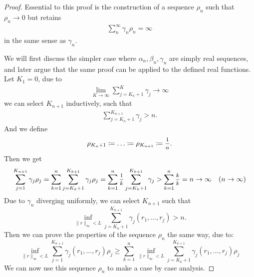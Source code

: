 \begin{proof}
    Essential to this proof is the construction of a sequence \(\rho_n\) such that \(\rho_n\to 0\) but retains
    \begin{align}\label{gamma tilde retains}
        \sum_n^\infty \gamma_n \rho_n =\infty
    \end{align}
    in the same sense as \(\gamma_n\).

    We will first discuss the simpler case where \(\alpha_n, \beta_n,\gamma_n\) are simply real sequences, and later argue that the same proof can be applied to the defined real functions. Let \(K_1=0\), due to
    \begin{align}
        \lim_{K\to\infty} \sum_{j=K_n+1}^K \gamma_j \to \infty
    \end{align}
    we can select \(K_{n+1}\) inductively, such that
    \begin{align}\label{K_n+1 selection}
        \sum_{j=K_n+1}^{K_{n+1}}\gamma_j > n.
    \end{align}
    And we define
    \begin{align}
        \rho_{K_n+1}\coloneqq\dots\coloneqq \rho_{K_{n+1}}\coloneqq\mfrac{1}{n}.
    \end{align}
    Then we get
    \[
        \sum_{j=1}^{K_{n+1}} \gamma_j\rho_j
        =\sum_{k=1}^n \sum_{j=K_k+1}^{K_{k+1}}\gamma_j \rho_j 
        = \sum_{k=1}^n \mfrac{1}{k}\sum_{j=K_k+1}^{K_{k+1}}\gamma_j > \sum_{k=1}^n \mfrac{k}{k}
        = n \to \infty \quad (n\to \infty)
    \]
    Due to \(\gamma_n\) diverging uniformly, we can select \(K_{n+1}\) such that
    \[
        \inf_{\|r\|_\infty<L} \sum_{j=K_n+1}^{K_{n+1}} \gamma_j(r_1,\dots,r_j) >n.
    \]
    Then we can prove the properties of the sequence \(\rho_n\) the same way, due to:
    \[
        \inf_{\|r\|_\infty<L}\sum_{j=1}^{K_{n+1}} \gamma_j(r_1,\dots,r_j)\rho_j \ge \sum_{k=1}^n \inf_{\|r\|_\infty<L}\sum_{j=K_k+1}^{K_{k+1}}\gamma_j(r_1,\dots,r_j) \rho_j 
    \]
    We can now use this sequence \(\rho_n\) to make a case by case analysis. 
    

\end{proof}
